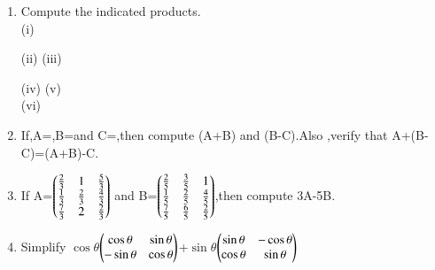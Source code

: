 \begin{enumerate}[label=\arabic*.,ref=\thesubsection.\theenumi]
\item Compute the indicated products.\\
(i) \\
\solution 

(ii) (iii) \\
\solution 

(iv) (v) \\
(vi) \\
\item If,A=,B=and C=,then compute (A+B) and (B-C).Also ,verify that A+(B-C)=(A+B)-C.\\
\item If A=$\begin{pmatrix}\frac{2}{3} & 1 & \frac{5}{3}\\ \frac{1}{3} & \frac{2}{3} & \frac{4}{3} \\ \frac{7}{3} &2  & \frac{2}{3}\end{pmatrix}$ and B=$\begin{pmatrix}\frac{2}{5} & \frac{3}{5} &1 \\ \frac{1}{5} & \frac{2}{5} & \frac{4}{5}\\ \frac{7}{5} & \frac{6}{5} & \frac{2}{5}\end{pmatrix}$,then compute 3A-5B.\\
\item Simplify $\cos\theta$$\begin{pmatrix}\cos\theta &\sin\theta\\ -\sin\theta &\cos\theta\end{pmatrix}$+$\sin\theta$$\begin{pmatrix}\sin\theta &-\cos\theta\\ \cos\theta &\sin\theta\end{pmatrix}$\\

\end{enumerate}

